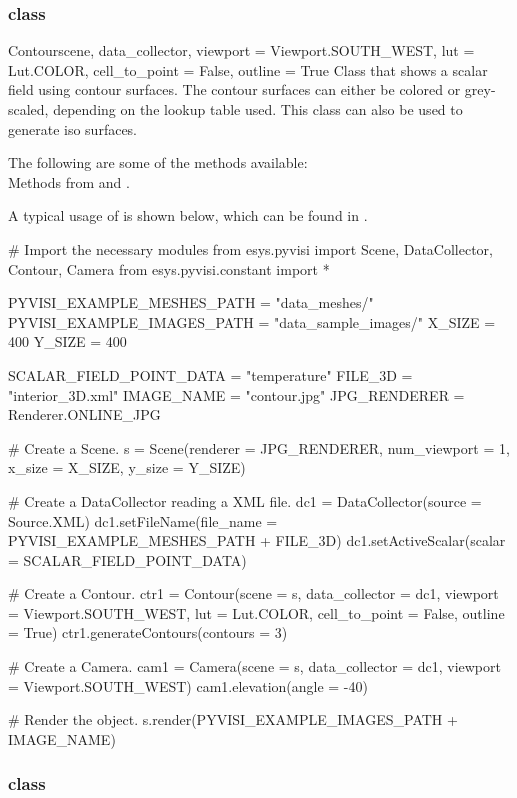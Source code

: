 \subsubsection{\Contour class}

\begin{classdesc}{Contour}{scene, data_collector, 
viewport = Viewport.SOUTH_WEST, lut = Lut.COLOR, cell_to_point = False, 
outline = True}
Class that shows a scalar field using contour surfaces. The contour surfaces can
either be colored or grey-scaled, depending on the lookup table used. This
class can also be used to generate iso surfaces.
\end{classdesc}

The following are some of the methods available:\\
Methods from \ActorThreeD and \ContourModule. 

A typical usage of \Contour is shown below, which can be found in 
\texttt{\PyvisiExampleDirectory}.

\begin{python}
# Import the necessary modules
from esys.pyvisi import Scene, DataCollector, Contour, Camera
from esys.pyvisi.constant import *

PYVISI_EXAMPLE_MESHES_PATH = "data_meshes/"
PYVISI_EXAMPLE_IMAGES_PATH = "data_sample_images/"
X_SIZE = 400
Y_SIZE = 400

SCALAR_FIELD_POINT_DATA = "temperature"
FILE_3D = "interior_3D.xml"
IMAGE_NAME = "contour.jpg"
JPG_RENDERER = Renderer.ONLINE_JPG


# Create a Scene.
s = Scene(renderer = JPG_RENDERER, num_viewport = 1, x_size = X_SIZE, 
        y_size = Y_SIZE)

# Create a DataCollector reading a XML file.
dc1 = DataCollector(source = Source.XML)
dc1.setFileName(file_name = PYVISI_EXAMPLE_MESHES_PATH + FILE_3D)
dc1.setActiveScalar(scalar = SCALAR_FIELD_POINT_DATA)

# Create a Contour.
ctr1 = Contour(scene = s, data_collector = dc1, viewport = Viewport.SOUTH_WEST,
        lut = Lut.COLOR, cell_to_point = False, outline = True)
ctr1.generateContours(contours = 3)

# Create a Camera.
cam1 = Camera(scene = s, data_collector = dc1, viewport = Viewport.SOUTH_WEST)
cam1.elevation(angle = -40)

# Render the object.
s.render(PYVISI_EXAMPLE_IMAGES_PATH + IMAGE_NAME)
\end{python}

\subsubsection{\ContourOnPlaneCut class}

